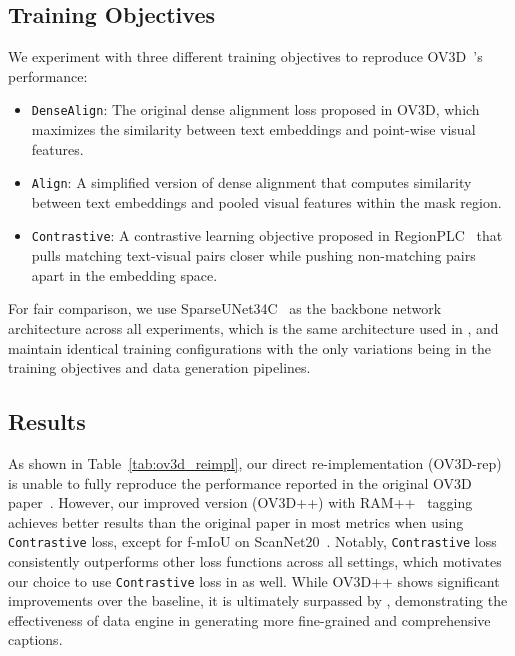 \subsection{Training Objectives}
We experiment with three different training objectives to reproduce OV3D~\cite{jiang2024open}'s performance:

\begin{itemize}
    \item \texttt{DenseAlign}: The original dense alignment loss proposed in OV3D, which maximizes the similarity between text embeddings and point-wise visual features.
    \item \texttt{Align}: A simplified version of dense alignment that computes similarity between text embeddings and pooled visual features within the mask region.
    \item \texttt{Contrastive}: A contrastive learning objective proposed in RegionPLC~\cite{yang2024regionplc} that pulls matching text-visual pairs closer while pushing non-matching pairs apart in the embedding space.
\end{itemize}
For fair comparison, we use SparseUNet34C~\cite{mink} as the backbone network architecture across all experiments, which is the same architecture used in \nickname, and maintain identical training configurations with the only variations being in the training objectives and data generation pipelines.

\subsection{Results}
As shown in Table~\ref{tab:ov3d_reimpl}, our direct re-implementation (OV3D-rep) is unable to fully reproduce the performance reported in the original OV3D paper~\cite{jiang2024open}.
However, our improved version (OV3D++) with RAM++~\cite{ram_pp} tagging achieves better results than the original paper in most metrics when using \texttt{Contrastive} loss, except for f-mIoU on ScanNet20~\cite{dai2017scannet}.
Notably, \texttt{Contrastive} loss consistently outperforms other loss functions across all settings, which motivates our choice to use \texttt{Contrastive} loss in \nickname as well.
While OV3D++ shows significant improvements over the baseline, it is ultimately surpassed by \nickname, demonstrating the effectiveness of \nickname data engine in generating more fine-grained and comprehensive captions.



